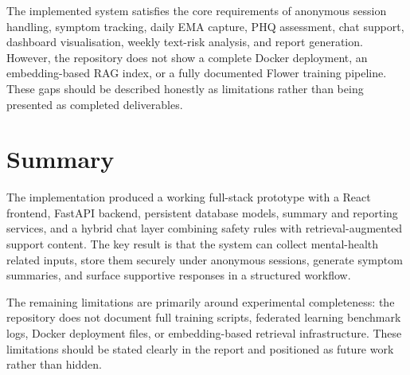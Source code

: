 The implemented system satisfies the core requirements of anonymous session handling, symptom tracking, daily EMA capture, PHQ assessment, chat support, dashboard visualisation, weekly text-risk analysis, and report generation. However, the repository does not show a complete Docker deployment, an embedding-based RAG index, or a fully documented Flower training pipeline. These gaps should be described honestly as limitations rather than being presented as completed deliverables.

\section{Summary}

The implementation produced a working full-stack prototype with a React frontend, FastAPI backend, persistent database models, summary and reporting services, and a hybrid chat layer combining safety rules with retrieval-augmented support content. The key result is that the system can collect mental-health related inputs, store them securely under anonymous sessions, generate symptom summaries, and surface supportive responses in a structured workflow.

The remaining limitations are primarily around experimental completeness: the repository does not document full training scripts, federated learning benchmark logs, Docker deployment files, or embedding-based retrieval infrastructure. These limitations should be stated clearly in the report and positioned as future work rather than hidden.